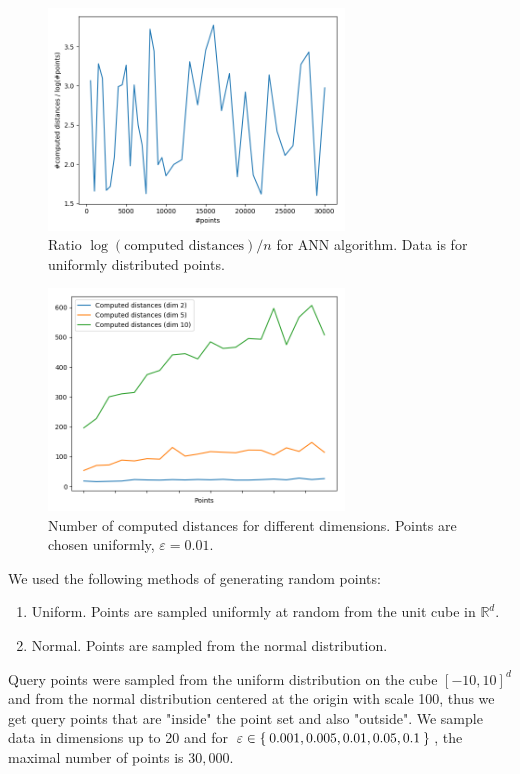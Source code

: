 \documentclass[a4paper,USenglish]{socg-lipics-v2018}
\newcommand{\R}{\mathbb{R}}
\newcommand{\eps}{\varepsilon}
\begin{document}
\begin{figure}[ht]
    \includegraphics[width=0.7\textwidth]{pics/log_dependency_constant_ratio.png}
    \caption{Ratio $\log(\mbox{computed distances}) / n$ for ANN algorithm. Data is for uniformly distributed
    points.}
    \label{fig:ann_const_ratio}
\end{figure}

\begin{figure}[ht]
    \includegraphics[width=0.7\textwidth]{pics/ann_computed_distances_dimension_dep.png}
    \caption{Number of computed distances for different dimensions. Points are chosen uniformly, $\eps = 0.01$.}
    \label{fig:ann_dimension_dependence}
\end{figure}


We used the following methods of generating random points:
\begin{enumerate}
    \item Uniform. Points are sampled uniformly at random from the unit cube in $\R^d$.
    \item Normal. Points are sampled from the normal distribution.
\end{enumerate}
Query points were sampled from the uniform distribution on the cube $[-10, 10]^d$
and from the normal distribution centered at the origin with scale 100,
thus we get query points that are "inside" the point set and also "outside".
We sample data in dimensions up to 20 and for $\eps \in \Set{0.001, 0.005, 0.01, 0.05, 0.1}$,
the maximal number of points is $30,000$.
\end{document}
